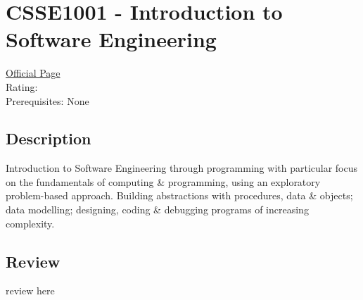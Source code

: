 \hypertarget{CSSE1001}{\section{CSSE1001 - Introduction to Software Engineering}}

\large
\textcolor{turbo_purple}{\href{https://my.uq.edu.au/programs-courses/course.html?course_code=CSSE1001}{Official Page}} \\
Rating: \cstar\cstar\cstar\cstar\ostar \\
Prerequisites: None

\normalsize
\subsection*{Description}
Introduction to Software Engineering through programming with particular focus on the fundamentals of computing \& programming, using an exploratory problem-based approach.
Building abstractions with procedures, data \& objects; data modelling; designing, coding \& debugging programs of increasing complexity.

\subsection*{Review}
review here
